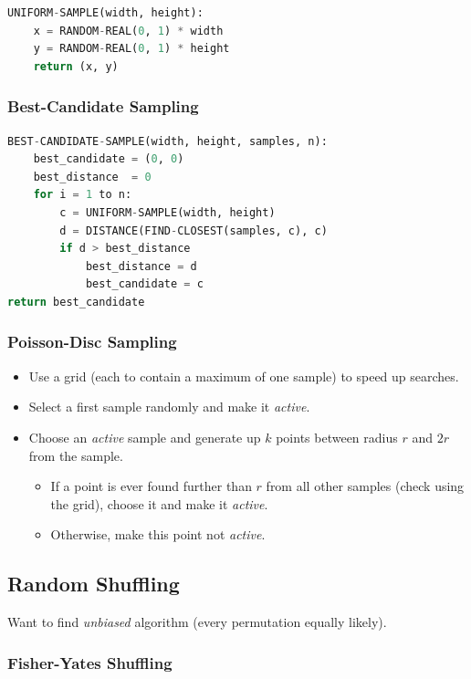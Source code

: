 \documentclass[twocolumn,english]{article}
\numberwithin{equation}{section}
\numberwithin{figure}{section}
\numberwithin{table}{section}
\begin{document}
\begin{lstlisting}[language=Python,basicstyle={\footnotesize\ttfamily},tabsize=4,frame=single]
UNIFORM-SAMPLE(width, height):
	x = RANDOM-REAL(0, 1) * width
	y = RANDOM-REAL(0, 1) * height
	return (x, y)
\end{lstlisting}

\subsubsection*{Best-Candidate Sampling}

\begin{lstlisting}[language=Python,basicstyle={\footnotesize\ttfamily},tabsize=4,frame=single]
BEST-CANDIDATE-SAMPLE(width, height, samples, n):
	best_candidate = (0, 0)
	best_distance  = 0
	for i = 1 to n:
		c = UNIFORM-SAMPLE(width, height)
		d = DISTANCE(FIND-CLOSEST(samples, c), c)
		if d > best_distance
			best_distance = d
			best_candidate = c
return best_candidate
\end{lstlisting}

\subsubsection*{Poisson-Disc Sampling}
\begin{itemize}
\item Use a grid (each to contain a maximum of one sample) to speed up searches.
\item Select a first sample randomly and make it \emph{active}.
\item Choose an \emph{active} sample and generate up $k$ points between
radius $r$ and $2r$ from the sample.
\begin{itemize}
\item If a point is ever found further than $r$ from all other samples
(check using the grid), choose it and make it \emph{active}.
\item Otherwise, make this point not \emph{active}.
\end{itemize}
\end{itemize}

\subsection{Random Shuffling}

Want to find \emph{unbiased} algorithm (every permutation equally
likely).

\subsubsection*{Fisher-Yates Shuffling}
\end{document}
